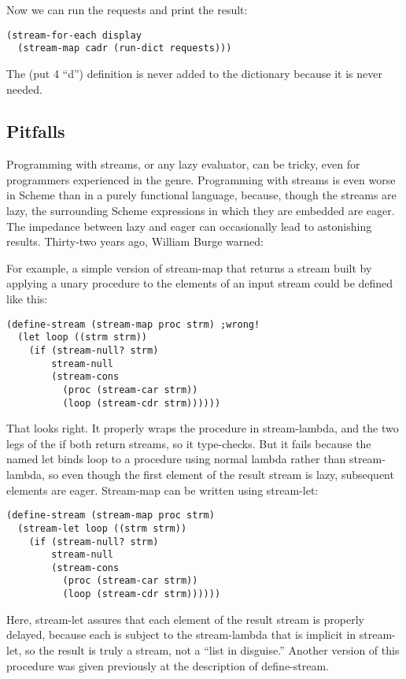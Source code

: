Now we can run the requests and print the result:

\begin{verbatim}
(stream-for-each display
  (stream-map cadr (run-dict requests)))
\end{verbatim}

The (put 4 ``d'') definition is never added to the dictionary because it
is never needed.

\subsection{Pitfalls}\label{pitfalls}

Programming with streams, or any lazy evaluator, can be tricky, even for
programmers experienced in the genre. Programming with streams is even
worse in Scheme than in a purely functional language, because, though
the streams are lazy, the surrounding Scheme expressions in which they
are embedded are eager. The impedance between lazy and eager can
occasionally lead to astonishing results. Thirty-two years ago, William
Burge warned:

For example, a simple version of stream-map that returns a stream built
by applying a unary procedure to the elements of an input stream could
be defined like this:

\begin{verbatim}
(define-stream (stream-map proc strm) ;wrong!
  (let loop ((strm strm))
    (if (stream-null? strm)
        stream-null
        (stream-cons
          (proc (stream-car strm))
          (loop (stream-cdr strm))))))
\end{verbatim}

That looks right. It properly wraps the procedure in stream-lambda, and
the two legs of the if both return streams, so it type-checks. But it
fails because the named let binds loop to a procedure using normal
lambda rather than stream-lambda, so even though the first element of
the result stream is lazy, subsequent elements are eager. Stream-map can
be written using stream-let:

\begin{verbatim}
(define-stream (stream-map proc strm)
  (stream-let loop ((strm strm))
    (if (stream-null? strm)
        stream-null
        (stream-cons
          (proc (stream-car strm))
          (loop (stream-cdr strm))))))
\end{verbatim}

Here, stream-let assures that each element of the result stream is
properly delayed, because each is subject to the stream-lambda that is
implicit in stream-let, so the result is truly a stream, not a ``list in
disguise.'' Another version of this procedure was given previously at
the description of define-stream.

